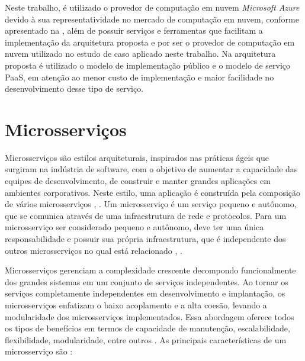 Neste trabalho, é utilizado o provedor de computação em nuvem \textit{Microsoft Azure} devido à sua representatividade no mercado de computação em nuvem, conforme apresentado na , além de possuir serviços e ferramentas que facilitam a implementação da arquitetura proposta e por ser o provedor de computação em nuvem utilizado no estudo de caso aplicado neste trabalho. Na arquitetura proposta é utilizado o modelo de implementação público e o modelo de serviço \acrshort{PaaS}, em atenção ao menor custo de implementação e maior facilidade no desenvolvimento desse tipo de serviço.

\section{Microsserviços}
\label{sec:microsserviços}




Microsserviços são estilos arquiteturais, inspirados nas práticas ágeis que surgiram na indústria de software, com o objetivo de aumentar a capacidade das equipes de desenvolvimento, de construir e manter grandes aplicações em ambientes corporativos. Neste estilo, uma aplicação é construída pela composição de vários microsserviços \cite{Dragoni2016}, \cite{Martins2017}. Um microsserviço é um serviço pequeno e autônomo, que se comunica através de uma infraestrutura de rede e protocolos. Para um microsserviço ser considerado pequeno e autônomo, deve ter uma única responsabilidade e possuir sua própria infraestrutura, que é independente dos outros microsserviços no qual está relacionado \cite{Lewis2014}, \cite{Martins2017}.

Microsserviços gerenciam a complexidade crescente decompondo funcionalmente dos grandes sistemas em um conjunto de serviços independentes. Ao tornar os serviços completamente independentes em desenvolvimento e implantação, os microsserviços enfatizam o baixo acoplamento e a alta coesão, levando a modularidade dos microsserviços implementados. Essa abordagem oferece todos os tipos de benefícios em termos de capacidade de manutenção, escalabilidade, flexibilidade, modularidade, entre outros \cite{Dragoni2016}. As principais características de um microsserviço são \cite{Dragoni2016}:

